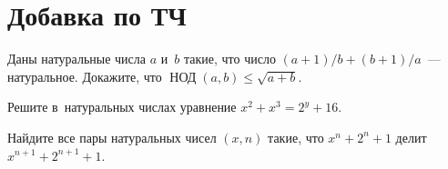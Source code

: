
\section*{Добавка по ТЧ}


\begin{problems}

\item
Даны натуральные числа $a$ и~$b$ такие, что
число $(a + 1) / b + (b + 1) / a$~--- натуральное.
Докажите, что $\mathop{\text{НОД}}(a, b) \leq \sqrt{a + b}$.

\item
Решите в~натуральных числах уравнение $x^2 + x^3 = 2^{y} + 16$.

\item
Найдите все пары натуральных чисел $(x, n)$ такие, что $x^{n} + 2^{n} + 1$
делит $x^{n+1} + 2^{n+1} + 1$.

\end{problems}

